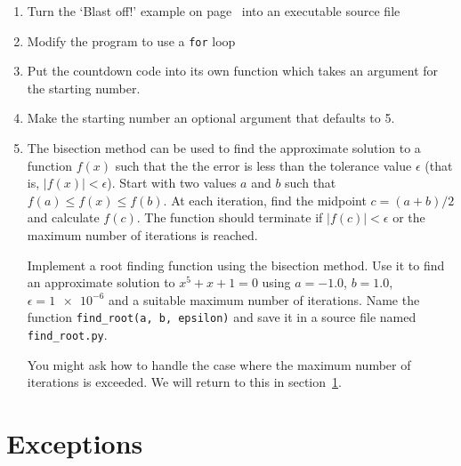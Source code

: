 \documentclass[a4paper,twoside,titlepage]{memoir}
\makeatletter
\newcommand{\FrameTitle}[2]{%
  \fboxrule=\FrameRule \fboxsep=\FrameSep
  \fbox{\vbox{\nobreak \vskip -0.7\FrameSep
    \rlap{\centerline{\strut#1}}\nobreak\nointerlineskip%
    \vskip 0.7\FrameSep
    \hbox{#2}}}}
\newenvironment{framewithtitle}[2][\FrameFirst@Lab\ (cont.)]{%
  \def\FrameFirst@Lab{\textbf{#2}}%
  \def\FrameCont@Lab{\textbf{#1}}%
  \def\FrameCommand##1{%
    \FrameTitle{\FrameFirst@Lab}{##1}}%
  \def\FirstFrameCommand##1{%
    \FrameTitle{\FrameFirst@Lab}{##1}}%
  \def\MidFrameCommand##1{%
    \FrameTitle{\FrameCont@Lab}{##1}}%
  \def\LastFrameCommand##1{%
    \FrameTitle{\FrameCont@Lab}{##1}}%
\MakeFramed{\advance\hsize-\width \FrameRestore}}%
{\endMakeFramed}
\newcounter{exercisectr}
\newenvironment{exercise}
{\stepcounter{exercisectr}\begin{framewithtitle}{Practical \arabic{exercisectr}}}
{\end{framewithtitle}}
\newcommand{\shellcmd}{\texttt}
\makeatother
\begin{document}
\begin{exercise}
\begin{enumerate}
\item Turn the `Blast off!' example on page~\pageref{blast-off} into an executable source file

\item Modify the program to use a \shellcmd{for} loop

\item Put the countdown code into its own function which takes an argument for the starting number.

\item Make the starting number an optional argument that defaults to 5.

\item The bisection method can be used to find the approximate solution to a function $f(x)$ such that the the error is less than the tolerance value $\epsilon$ (that is, $| f(x) | < \epsilon$).  Start with two values $a$ and $b$ such that $f(a) \leq f(x) \leq f(b)$.  At each iteration, find the midpoint $c = \left(a + b\right) / 2$ and calculate $f(c)$.  The function should terminate if $| f(c) | < \epsilon$ or the maximum number of iterations is reached.

Implement a root finding function using the bisection method.  Use it to find an approximate solution to $x^5 + x + 1 = 0$ using $a = -1.0$, $b = 1.0$, $\epsilon = \num{1e-6}$ and a suitable maximum number of iterations.  Name the function \shellcmd{find\_root(a, b, epsilon)} and save it in a source file named \shellcmd{find\_root.py}.

You might ask how to handle the case where the maximum number of iterations is exceeded.  We will return to this in section~\ref{sec:exceptions}.
\end{enumerate}
\end{exercise}

\section{Exceptions}
\label{sec:exceptions}
\end{document}
